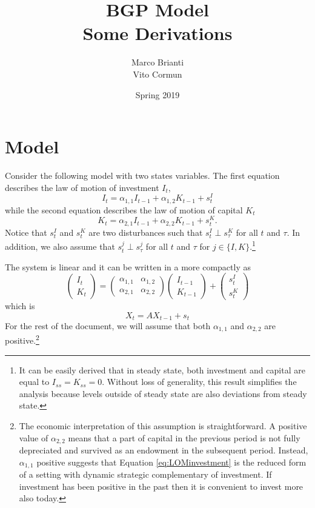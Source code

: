 \documentclass{article}
\title{BGP Model\\Some Derivations}
\author{Marco Brianti\\Vito Cormun}
\date{Spring 2019}
\begin{document}
\maketitle

\section{Model}\label{sec:model}

Consider the following model with two states variables. The first equation describes the law of motion of investment $I_t$,
\begin{equation}\label{eq:LOMinvestment}
I_t = \alpha_{1,1} I_{t-1} + \alpha_{1,2} K_{t-1} + s_t^I
\end{equation}
while the second equation describes the law of motion of capital $K_t$
\begin{equation}\label{eq:LOMcapital}
K_t = \alpha_{2,1} I_{t-1} + \alpha_{2,2} K_{t-1} + s_t^K.
\end{equation}
Notice that $s_t^I$ and $s_t^K$ are two disturbances such that $s_t^I \perp s_{\tau}^K$ for all $t$ and $\tau$. In addition, we also assume that $s_t^j \perp s_{\tau}^j$ for all $t$ and $\tau$ for $j \in \{ I,K\}$.\footnote{It can be easily derived that in steady state, both investment and capital are equal to $I_{ss} = K_{ss} = 0$. Without loss of generality, this result simplifies the analysis because levels outside of steady state are also deviations from steady state.}

The system is linear and it can be written in a more compactly as
\begin{equation}\label{eq:matrix_system_expanded}
\begin{pmatrix}
I_t \\
K_t
\end{pmatrix} = \begin{pmatrix}
\alpha_{1,1} & \alpha_{1,2} \\
\alpha_{2,1} & \alpha_{2,2}
\end{pmatrix}\begin{pmatrix}
I_{t-1} \\
K_{t-1}
\end{pmatrix} + \begin{pmatrix}
s_t^I \\ 
s_t^K
\end{pmatrix}
\end{equation}
which is
\begin{equation}\label{eq:matrix_system_compact}
X_t = A X_{t-1} + s_t
\end{equation}
For the rest of the document, we will assume that both $\alpha_{1,1}$ and $\alpha_{2,2}$ are positive.\footnote{The economic interpretation of this assumption is straightforward. A positive value of $\alpha_{2,2}$ means that a part of capital in the previous period is not fully depreciated and survived as an endowment in the subsequent period. Instead, $\alpha_{1,1}$ positive suggests that Equation \ref{eq:LOMinvestment} is the reduced form of a setting with dynamic strategic complementary of investment. If investment has been positive in the past then it is convenient to invest more also today.}
\end{document}
